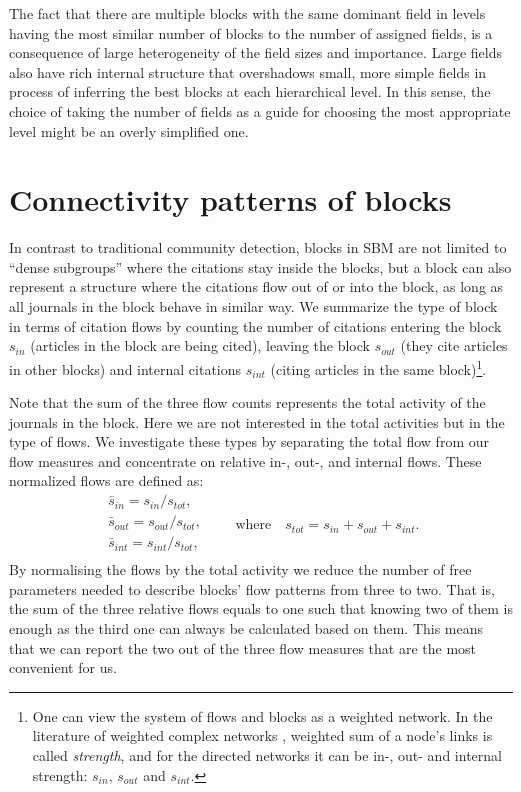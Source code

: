 \documentclass[a4paper,12pt]{article}
\begin{document}
The fact that there are multiple blocks with the same dominant field in levels having 
the most similar number of blocks to the number of assigned fields, is a consequence of 
large heterogeneity of the field sizes and importance. Large fields also have rich internal 
structure that overshadows small, more simple fields in process of inferring the 
best blocks at each hierarchical level. In this sense, the choice of taking the number of 
fields as a guide for choosing the most appropriate level might be an overly simplified 
one.



\section{Connectivity patterns of blocks}
\label{sec:conn_patt}

In contrast to traditional community detection, blocks in SBM are not limited to ``dense 
subgroups'' where the citations stay inside the blocks, 
but a block can also represent a structure where the citations flow out of or into the block, as long as all journals in the block 
behave in similar way.
We summarize the type of block in terms of citation flows by counting the number of citations entering the 
block $s_{in}$ (articles in the block are being cited), leaving the block $s_{out}$ (they cite articles in other 
blocks) and internal citations $s_{int}$ (citing articles in the same block)\footnote{One
can view the system of flows and blocks as a weighted network.
In the literature of weighted complex networks \citep{Barrat2004}, weighted sum of a node's links is called \emph{strength}, and for the directed networks it 
can be in-, out- and internal strength: $s_{in}$, $s_{out}$ and $s_{int}$.}.

Note that the sum of the three flow counts represents the total activity of the journals in the block.
Here we are not interested in the total activities but in the type of flows.
We investigate these types by  separating the total flow from our flow measures and concentrate on relative in-, out-, and internal flows.
These normalized flows are defined as:
\begin{equation}
  \begin{aligned}
    \bar{s}_{in}=s_{in}/s_{tot}, \\
    \bar{s}_{out}=s_{out}/s_{tot}, \\
    \bar{s}_{int}=s_{int}/s_{tot}, \\
  \end{aligned}
  \qquad \text{where} \quad s_{tot}=s_{in}+s_{out}+s_{int}.
  \label{eq:s_def}
\end{equation}
By normalising the flows by the total activity we reduce the number of free parameters 
needed to describe blocks' flow patterns from three to two. That is, the sum of the 
three relative flows equals to one such that knowing two of them is enough as the third one can always be calculated based on them.
This means that we can report the two out of the three flow measures that are the most convenient for us. 
\end{document}
